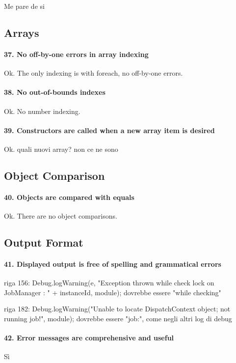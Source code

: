 \documentclass[english]{article}
\begin{document}
Me pare de si


\subsection{Arrays}
\paragraph{37. No off-by-one errors in array indexing}
Ok.
The only indexing is with foreach, no off-by-one errors.

\paragraph{38. No out-of-bounds indexes}
Ok.
No number indexing.

\paragraph{39. Constructors are called when a new array item is desired}
Ok.
quali nuovi array? non ce ne sono

\subsection{Object Comparison}
\paragraph{40. Objects are compared with equals}
Ok.
There are no object comparisons.

\subsection{Output Format}
\paragraph{41. Displayed output is free of spelling and grammatical errors}
riga 156:
Debug.logWarning(e, "Exception thrown while check lock on JobManager : " + instanceId, module);
dovrebbe essere "while checking"

riga 182:
Debug.logWarning("Unable to locate DispatchContext object; not running job!", module);
dovrebbe essere "job:", come negli altri log di debug

\paragraph{42. Error messages are comprehensive and useful}
Sì
\end{document}

